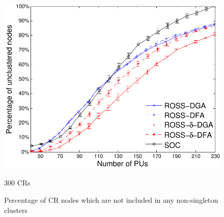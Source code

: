 \documentclass[10pt,journal,compsoc]{IEEEtran}
\theoremstyle{mytheoremstyle}
\theoremstyle{mytheoremstyle}
\theoremstyle{mytheoremstyle}
\begin{document}
\begin{figure}[t]
\begin{multicols}{3}
    \includegraphics[width=\linewidth]{survival_rate_300_edge50.pdf}\par\caption{300 CRs}\label{singleton_clusters_300}
\end{multicols}\caption{Percentage of CR nodes which are not included in any non-singleton clusters}
\label{unclustered_100_200_300}
\end{figure}

\end{document}
